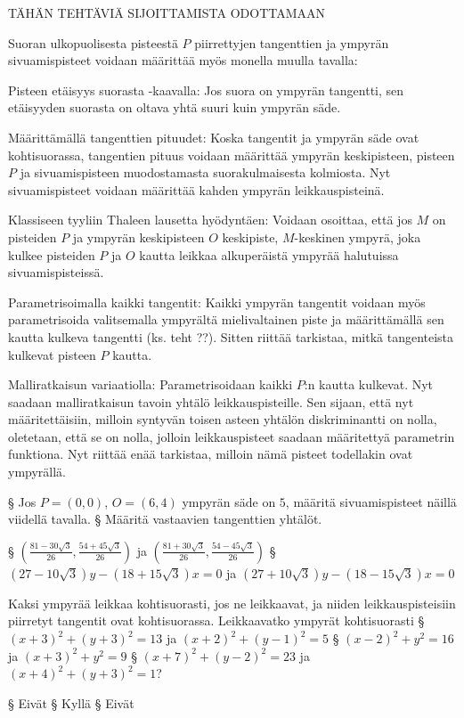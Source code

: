 \begin{tehtavasivu}
TÄHÄN TEHTÄVIÄ SIJOITTAMISTA ODOTTAMAAN

\begin{tehtava}
Suoran ulkopuolisesta pisteestä $P$ piirrettyjen tangenttien ja ympyrän sivuamispisteet voidaan määrittää myös monella muulla tavalla:

Pisteen etäisyys suorasta -kaavalla: Jos suora on ympyrän tangentti, sen etäisyyden suorasta on oltava yhtä suuri kuin ympyrän säde.

Määrittämällä tangenttien pituudet: Koska tangentit ja ympyrän säde ovat kohtisuorassa, tangentien pituus voidaan määrittää ympyrän keskipisteen, pisteen $P$ ja sivuamispisteen muodostamasta suorakulmaisesta kolmiosta. Nyt sivuamispisteet voidaan määrittää kahden ympyrän leikkauspisteinä.

Klassiseen tyyliin Thaleen lausetta hyödyntäen: Voidaan osoittaa, että jos $M$ on pisteiden $P$ ja ympyrän keskipisteen $O$ keskipiste, $M$-keskinen ympyrä, joka kulkee pisteiden $P$ ja $O$ kautta leikkaa alkuperäistä ympyrää halutuissa sivuamispisteissä.

Parametrisoimalla kaikki tangentit: Kaikki ympyrän tangentit voidaan myös parametrisoida valitsemalla ympyrältä mielivaltainen piste ja määrittämällä sen kautta kulkeva tangentti (ks. teht ??). Sitten riittää tarkistaa, mitkä tangenteista kulkevat pisteen $P$ kautta.

Malliratkaisun variaatiolla: Parametrisoidaan kaikki $P$:n kautta kulkevat. Nyt saadaan malliratkaisun tavoin yhtälö leikkauspisteille. Sen sijaan, että nyt määritettäisiin, milloin syntyvän toisen asteen yhtälön diskriminantti on nolla, oletetaan, että se on nolla, jolloin leikkauspisteet saadaan määritettyä parametrin funktiona. Nyt riittää enää tarkistaa, milloin nämä pisteet todellakin ovat ympyrällä.

\alakohdat
§ Jos $P = (0,0)$, $O = (6,4)$ ympyrän säde on $5$, määritä sivuamispisteet näillä viidellä tavalla.
§ Määritä vastaavien tangenttien yhtälöt.
\loppu
\begin{vastaus}
\alakohdat
§ $(\frac{81-30\sqrt{3}}{26},\frac{54+45\sqrt{3}}{26})$ ja $(\frac{81+30\sqrt{3}}{26},\frac{54-45\sqrt{3}}{26})$
§ $(27-10\sqrt{3})y-(18+15\sqrt{3})x = 0$ ja $(27+10\sqrt{3})y-(18-15\sqrt{3})x = 0$
\loppu
\end{vastaus}
\end{tehtava}

\begin{tehtava}
Kaksi ympyrää leikkaa kohtisuorasti, jos ne leikkaavat, ja niiden leikkauspisteisiin piirretyt tangentit ovat kohtisuorassa. Leikkaavatko ympyrät kohtisuorasti
\alakohdat
§ $(x+3)^2+(y+3)^2= 13$ ja $(x+2)^2+(y-1)^2 = 5 $
§ $(x-2)^2+y^2 = 16$ ja $(x+3)^2+y^2 = 9$
§ $(x+7)^2+(y-2)^2 = 23$ ja $(x+4)^2+(y+3)^2 = 1$?
\loppu  
\begin{vastaus}
\alakohdat
§ Eivät
§ Kyllä
§ Eivät
\loppu
\end{vastaus}
\end{tehtava}


\end{tehtavasivu}
